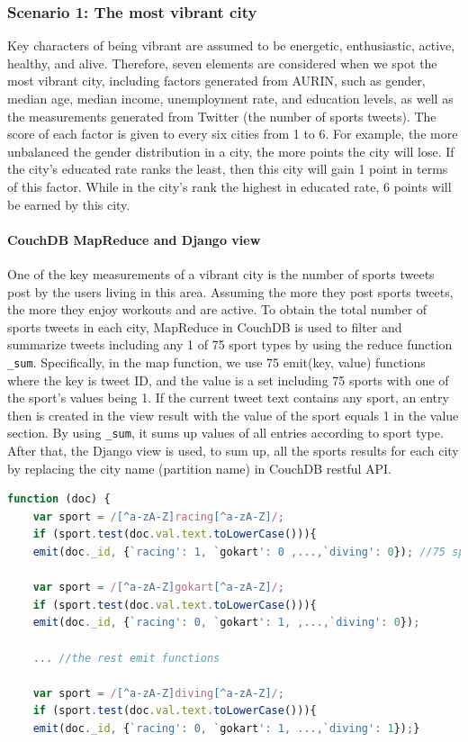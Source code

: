 \subsubsection{Scenario 1: The most vibrant city}
Key characters of being vibrant are assumed to be energetic, enthusiastic, active, healthy, and alive. Therefore, seven elements are considered when we spot the most vibrant city, including factors generated from AURIN, such as gender, median age, median income, unemployment rate, and education levels, as well as the measurements generated from Twitter (the number of sports tweets). The score of each factor is given to every six cities from 1 to 6. For example, the more unbalanced the gender distribution in a city, the more points the city will lose. If the city's educated rate ranks the least, then this city will gain 1 point in terms of this factor. While in the city's rank the highest in educated rate, 6 points will be earned by this city. 

\paragraph{CouchDB MapReduce and Django view}

One of the key measurements of a vibrant city is the number of sports tweets post by the users living in this area. Assuming the more they post sports tweets, the more they enjoy workouts and are active. To obtain the total number of sports tweets in each city, MapReduce in CouchDB is used to filter and summarize tweets including any 1 of 75 sport types by using the reduce function \texttt{_sum}. Specifically, in the map function, we use 75 emit(key, value) functions where the key is tweet ID, and the value is a set including 75 sports with one of the sport's values being 1. If the current tweet text contains any sport, an entry then is created in the view result with the value of the sport equals 1 in the value section. By using \texttt{_sum}, it sums up values of all entries according to sport type. After that, the Django view is used, to sum up, all the sports results for each city by replacing the city name (partition name) in CouchDB restful API. 

\begin{lstlisting}[language=JavaScript, caption= Map Functions for Sports Tweets, backgroundcolor = \color{white}]
function (doc) {
    var sport = /[^a-zA-Z]racing[^a-zA-Z]/;
    if (sport.test(doc.val.text.toLowerCase())){
    emit(doc._id, {`racing': 1, `gokart': 0 ,...,`diving': 0}); //75 sports elements
    
    var sport = /[^a-zA-Z]gokart[^a-zA-Z]/;
    if (sport.test(doc.val.text.toLowerCase())){
    emit(doc._id, {`racing': 0, `gokart': 1, ,...,`diving': 0});
    
    ... //the rest emit functions 
    
    var sport = /[^a-zA-Z]diving[^a-zA-Z]/;
    if (sport.test(doc.val.text.toLowerCase())){
    emit(doc._id, {`racing': 0, `gokart': 1, ...,`diving': 1});}
\end{lstlisting}

